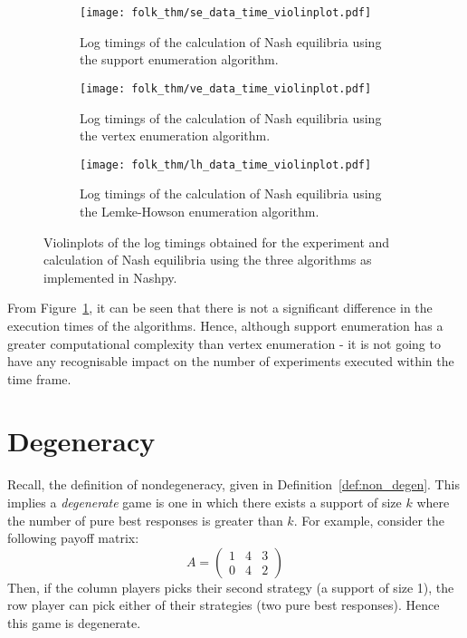 \begin{figure}
    \begin{subfigure}{0.3\textwidth}
        \centering
        \texttt{[image: folk\_thm/se\_data\_time\_violinplot.pdf]}
        \caption{Log timings of the calculation of Nash equilibria using the support enumeration algorithm.}
    \end{subfigure}
    \begin{subfigure}{0.3\textwidth}
        \centering
        \texttt{[image: folk\_thm/ve\_data\_time\_violinplot.pdf]}
        \caption{Log timings of the calculation of Nash equilibria using the vertex enumeration algorithm.}
    \end{subfigure}
    \begin{subfigure}{0.3\textwidth}
        \centering
        \texttt{[image: folk\_thm/lh\_data\_time\_violinplot.pdf]}
        \caption{Log timings of the calculation of Nash equilibria using the Lemke-Howson enumeration algorithm.}
    \end{subfigure}
    \caption{Violinplots of the log timings obtained for the experiment and calculation of Nash equilibria using the three algorithms as implemented in Nashpy.}\label{fig:timing_exp}
\end{figure}

From Figure~\ref{fig:timing_exp}, it can be seen that there is not a significant
difference in the execution times of the algorithms. Hence, although support
enumeration has a greater computational complexity than vertex enumeration - it
is not going to have any recognisable impact on the number of experiments
executed within the time frame.


\section{Degeneracy}\label{sec:Degeneracy}
Recall, the definition of nondegeneracy, given in
Definition~\ref{def:non_degen}. This implies a \emph{degenerate} game is one in
which there exists a support of size \(k\) where the number of pure best
responses is greater than \(k\). For example, consider the following payoff
matrix:
\begin{equation}
    A = \begin{pmatrix}
        1 & 4 & 3\\
        0 & 4 & 2
    \end{pmatrix}
\end{equation}
Then, if the column players picks their second strategy (a support of size 1),
the row player can pick either of their strategies (two pure best responses).
Hence this game is degenerate.

